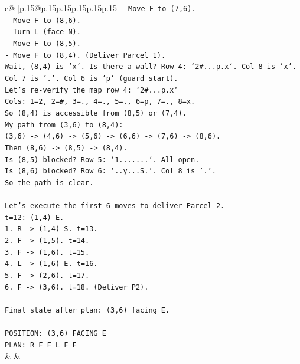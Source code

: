\documentclass{article}
\begin{document}
{\begin{supertabular}{c@{$\;$}|p{.15\linewidth}@{}p{.15\linewidth}p{.15\linewidth}p{.15\linewidth}p{.15\linewidth}p{.15\linewidth}}
{{{\texttt{{-} Move F to (7,6).} \\
\texttt{{-} Move F to (8,6).} \\
\texttt{{-} Turn L (face N).} \\
\texttt{{-} Move F to (8,5).} \\
\texttt{{-} Move F to (8,4). (Deliver Parcel 1).} \\
\texttt{Wait, (8,4) is 'x'. Is there a wall? Row 4: `2\#...p.x`. Col 8 is 'x'. Col 7 is '.'. Col 6 is 'p' (guard start).} \\
\texttt{Let's re{-}verify the map row 4: `2\#...p.x`} \\
\texttt{Cols: 1=2, 2=\#, 3=., 4=., 5=., 6=p, 7=., 8=x.} \\
\texttt{So (8,4) is accessible from (8,5) or (7,4).} \\
\texttt{My path from (3,6) to (8,4):} \\
\texttt{(3,6) {-}> (4,6) {-}> (5,6) {-}> (6,6) {-}> (7,6) {-}> (8,6).} \\
\texttt{Then (8,6) {-}> (8,5) {-}> (8,4).} \\
\texttt{Is (8,5) blocked? Row 5: `1.......`. All open.} \\
\texttt{Is (8,6) blocked? Row 6: `..y...S.`. Col 8 is '.'.} \\
\texttt{So the path is clear.} \\
\\ 
\texttt{Let's execute the first 6 moves to deliver Parcel 2.} \\
\texttt{t=12: (1,4) E.} \\
\texttt{1. R {-}> (1,4) S. t=13.} \\
\texttt{2. F {-}> (1,5). t=14.} \\
\texttt{3. F {-}> (1,6). t=15.} \\
\texttt{4. L {-}> (1,6) E. t=16.} \\
\texttt{5. F {-}> (2,6). t=17.} \\
\texttt{6. F {-}> (3,6). t=18. (Deliver P2).} \\
\\ 
\texttt{Final state after plan: (3,6) facing E.} \\
\\ 
\texttt{POSITION: (3,6) FACING E} \\
\texttt{PLAN: R F F L F F} \\
            }
        }
    }
    & & \\ \\


\end{supertabular}}
\end{document}
